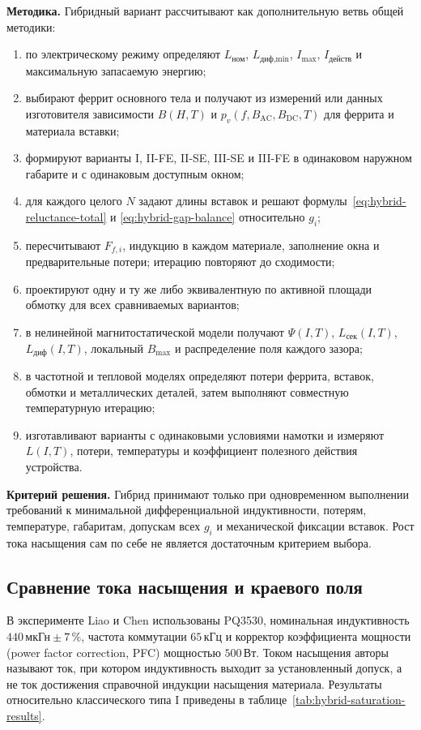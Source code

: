 \documentclass[14pt,a4paper]{extarticle}
\newcommand{\method}{\par\noindent\textbf{Методика.} }
\newcommand{\criterion}{\par\noindent\textbf{Критерий решения.} }
\begin{document}
\method Гибридный вариант рассчитывают как дополнительную ветвь общей
методики:
\begin{enumerate}
 \item по электрическому режиму определяют $L_{\text{ном}}$,
 $L_{\text{диф,min}}$, $I_{\max}$, $I_{\text{действ}}$ и максимальную
 запасаемую энергию;
 \item выбирают феррит основного тела и получают из измерений или данных
 изготовителя зависимости $B(H,T)$ и $p_v(f,B_{\text{AC}},B_{\text{DC}},T)$
 для феррита и материала вставки;
 \item формируют варианты I, II-FE, II-SE, III-SE и III-FE в одинаковом
 наружном габарите и с одинаковым доступным окном;
 \item для каждого целого $N$ задают длины вставок и решают
 формулы~\eqref{eq:hybrid-reluctance-total} и
 \eqref{eq:hybrid-gap-balance} относительно $g_i$;
 \item пересчитывают $F_{f,i}$, индукцию в каждом материале, заполнение
 окна и предварительные потери; итерацию повторяют до сходимости;
 \item проектируют одну и ту же либо эквивалентную по активной площади
 обмотку для всех сравниваемых вариантов;
 \item в нелинейной магнитостатической модели получают $\Psi(I,T)$,
 $L_{\text{сек}}(I,T)$, $L_{\text{диф}}(I,T)$, локальный $B_{\max}$ и
 распределение поля каждого зазора;
 \item в частотной и тепловой моделях определяют потери феррита, вставок,
 обмотки и металлических деталей, затем выполняют совместную температурную
 итерацию;
 \item изготавливают варианты с одинаковыми условиями намотки и измеряют
 $L(I,T)$, потери, температуры и коэффициент полезного действия устройства.
\end{enumerate}

\criterion Гибрид принимают только при одновременном выполнении требований
к минимальной дифференциальной индуктивности, потерям, температуре,
габаритам, допускам всех $g_i$ и механической фиксации вставок. Рост тока
насыщения сам по себе не является достаточным критерием выбора.

\subsection{Сравнение тока насыщения и краевого поля}

В эксперименте Liao и Chen использованы PQ3530, номинальная индуктивность
$440\,\text{мкГн}\pm7\,\%$, частота коммутации $65\,\text{кГц}$ и корректор
коэффициента мощности (power factor correction, PFC) мощностью
$500\,\text{Вт}$. Током насыщения авторы называют ток, при котором
индуктивность выходит за установленный допуск, а не ток достижения
справочной индукции насыщения материала. Результаты относительно
классического типа I приведены в
таблице~\ref{tab:hybrid-saturation-results}.
\end{document}
